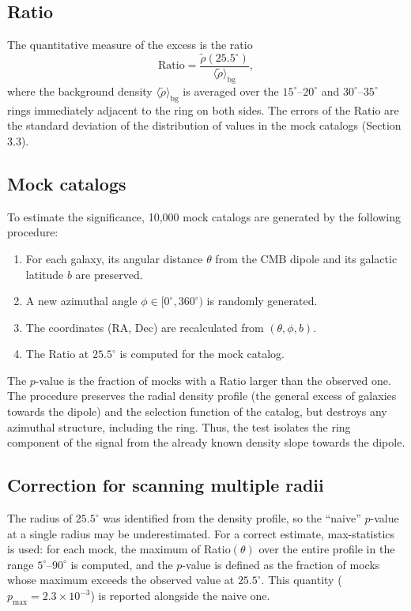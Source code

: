 \documentclass[11pt,a4paper]{article}
\begin{document}
\subsection{Ratio}

The quantitative measure of the excess is the ratio
\begin{equation}
\text{Ratio} = \frac{\tilde{\rho}(25.5^\circ)}{\langle \tilde{\rho} \rangle_{\text{bg}}},
\end{equation}
where the background density \(\langle \tilde{\rho} \rangle_{\text{bg}}\)
is averaged over the \(15^\circ\)--\(20^\circ\) and \(30^\circ\)--\(35^\circ\)
rings immediately adjacent to the ring on both sides.
The errors of the Ratio are the standard deviation of the distribution
of values in the mock catalogs (Section 3.3).

\subsection{Mock catalogs}

To estimate the significance, 10,000 mock catalogs are generated
by the following procedure:
\begin{enumerate}
\item For each galaxy, its angular distance \(\theta\) from the CMB dipole
and its galactic latitude \(b\) are preserved.
\item A new azimuthal angle \(\phi \in [0^\circ, 360^\circ)\) is randomly generated.
\item The coordinates (RA, Dec) are recalculated from \((\theta, \phi, b)\).
\item The Ratio at \(25.5^\circ\) is computed for the mock catalog.
\end{enumerate}
The \(p\)-value is the fraction of mocks with a Ratio larger than the observed one.
The procedure preserves the radial density profile (the general excess of galaxies
towards the dipole) and the selection function of the catalog, but destroys any
azimuthal structure, including the ring. Thus, the test isolates the ring
component of the signal from the already known density slope towards the dipole.

\subsection{Correction for scanning multiple radii}

The radius of \(25.5^\circ\) was identified from the density profile, so the
``naive'' \(p\)-value at a single radius may be underestimated.
For a correct estimate, max-statistics is used: for each mock, the maximum
of Ratio\((\theta)\) over the entire profile in the range \(5^\circ\)--\(90^\circ\)
is computed, and the \(p\)-value is defined as the fraction of mocks whose maximum
exceeds the observed value at \(25.5^\circ\). This quantity
(\(p_{\max} = 2.3 \times 10^{-3}\)) is reported alongside the naive one.
\end{document}
